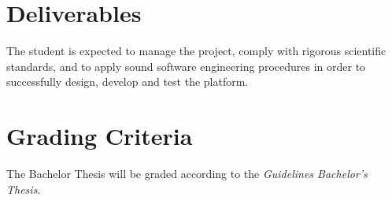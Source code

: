 \documentclass[a4paper, oneside]{discothesis}
\begin{document}
\section*{Deliverables}

The student is expected to manage the project, comply with rigorous scientific standards,
and to apply sound software engineering procedures in order to successfully design, develop
and test the platform.

\section*{Grading Criteria}

The Bachelor Thesis will be graded according to the \emph{Guidelines Bachelor’s Thesis}\cite{BscThesisGuidelines}.




\end{document}
